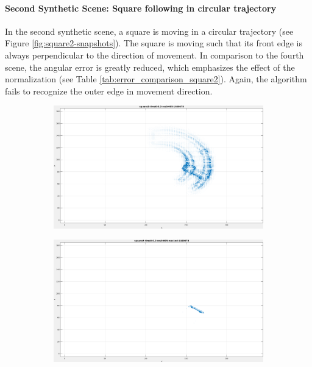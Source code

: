 \paragraph{Second Synthetic Scene: Square following in circular trajectory}

In the second synthetic scene, a square is moving in a circular trajectory (see Figure \ref{fig:square2-snapshots}).
The square is moving such that its front edge is always perpendicular to the direction of movement.
In comparison to the fourth scene, the angular error is greatly reduced, which emphasizes the effect of the normalization (see Table \ref{tab:error_comparison_square2}).
Again, the algorithm fails to recognize the outer edge in movement direction.

\begin{figure}[tb]
\centering
\begin{subfigure}{.45\textwidth}
  \centering
  \includegraphics[height=.6\linewidth]{figs/square2/square2-1.png}
  \caption{}
\end{subfigure}
\begin{subfigure}{.45\textwidth}
  \includegraphics[height=.6\linewidth]{figs/square2/square2-masked-1.png}

\end{subfigure}
\end{figure}
